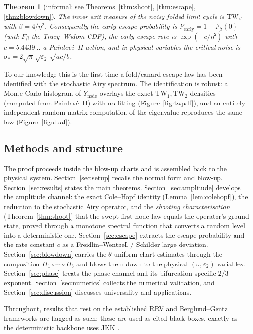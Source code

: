\documentclass[11pt,reqno]{amsart}
\theoremstyle{plain}
\newtheorem{theorem}{Theorem}
\theoremstyle{definition}
\theoremstyle{remark}
\newcommand{\TW}{\mathrm{TW}}
\newcommand{\Ynode}{Y_{\mathrm{node}}}
\newcommand{\Pearly}{P_{\mathrm{early}}}
\newcommand{\ep}{\varepsilon}
\begin{document}
\begin{theorem}[informal; see Theorems~\ref{thm:shoot}, \ref{thm:escape},
\ref{thm:blowdown}]\label{thm:intro}
The inner exit measure of the noisy folded limit cycle is $\TW_\beta$ with $\beta=4/\eta^2$.
Consequently the early-escape probability is $\Pearly=1-F_\beta(0)$ (with $F_\beta$ the
Tracy--Widom CDF), the early-escape rate is $\exp(-c/\eta^2)$ with $c=5.4439\ldots$ a
Painlev\'e~II action, and in physical variables the critical noise is
$\sigma_*=2\sqrt\pi\,\sqrt{\ep_2}\,\sqrt{ac/b}$.
\end{theorem}

To our knowledge this is the first time a fold/canard escape law has been identified with
the stochastic Airy spectrum. The identification is robust: a Monte-Carlo histogram of
$\Ynode$ overlays the exact $\TW_1,\TW_2$ densities (computed from Painlev\'e~II) with no
fitting (Figure~\ref{fig:twpdf}), and an entirely independent random-matrix computation of
the eigenvalue reproduces the same law (Figure~\ref{fig:dual}).

\subsection{Methods and structure}
The proof proceeds inside the blow-up charts and is assembled back to the physical system.
Section~\ref{sec:setup} recalls the normal form and blow-up. Section~\ref{sec:results}
states the main theorems. Section~\ref{sec:amplitude} develops the amplitude channel: the
exact Cole--Hopf identity (Lemma~\ref{lem:colehopf}), the reduction to the stochastic Airy
operator, and the \emph{shooting characterisation} (Theorem~\ref{thm:shoot}) that the swept
first-node law equals the operator's ground state, proved through a monotone spectral
function that converts a random level into a deterministic one.
Section~\ref{sec:escape} extracts the escape probability and the rate constant $c$ as a
Freidlin--Wentzell / Schilder large deviation. Section~\ref{sec:blowdown} carries the
$\theta$-uniform chart estimates through the composition $\Pi_1\circ\cdots\circ\Pi_3$ and
blows them down to the physical $(\sigma,\ep_2)$ variables.
Section~\ref{sec:phase} treats the phase channel and its bifurcation-specific $2/3$
exponent. Section~\ref{sec:numerics} collects the numerical validation, and
Section~\ref{sec:discussion} discusses universality and applications.

Throughout, results that rest on the established RRV \cite{RRV} and Berglund--Gentz
\cite{BG} frameworks are flagged as such; these are used as cited black boxes, exactly as
the deterministic backbone uses JKK \cite{JKK}.
\end{document}
